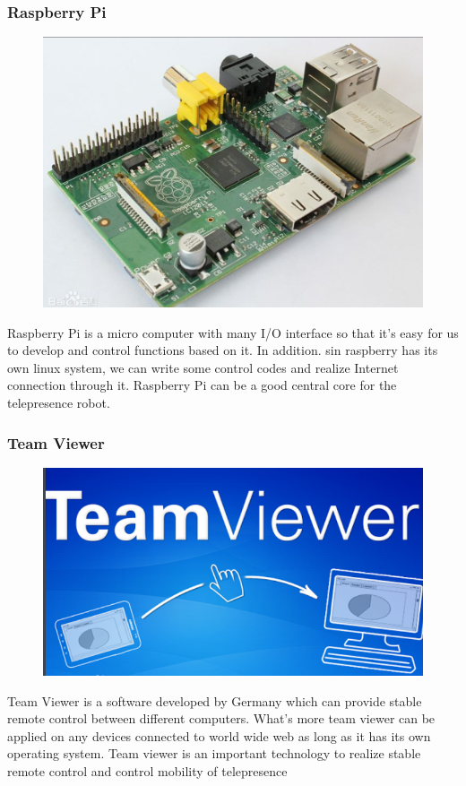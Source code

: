 \documentclass[12pt]{article}
\begin{document}
{\subsubsection{Raspberry Pi}
\begin{figure}[H]
\centering
\includegraphics[scale=0.15]{P3.png}
\end{figure}
Raspberry Pi is a micro computer with many I/O interface so that it's easy for us to develop and control functions based on it. In addition. sin raspberry has its own linux system, we can write some control codes and realize Internet connection through it. Raspberry Pi can be a good central core for the telepresence robot.
\subsubsection{Team Viewer}
\begin{figure}[H]
\centering
\includegraphics[scale=0.3]{P4.png}
\end{figure}
Team Viewer is a software developed by Germany which can provide stable remote control between different computers. What's more team viewer can be applied on any devices connected to world wide web as long as it has its own operating system. Team viewer is an important technology to realize stable remote control and control mobility of telepresence
}
\end{document}
